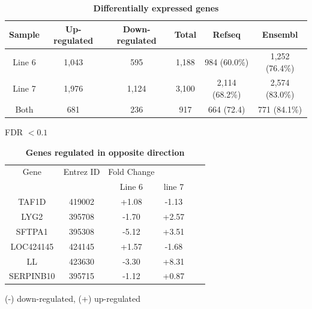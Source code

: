 \documentclass[10pt]{article}
\begin{document}
\begin{table}[!ht]
\caption{
\bf{Differentially expressed genes}}
\begin{tabular}{cccccc}
\hline
Sample & Up-regulated & Down-regulated & Total & Refseq & Ensembl\\
\hline
Line 6 & 1,043 & 595 & 1,188 & 984 (60.0\%) & 1,252 (76.4\%) \\
Line 7 & 1,976 & 1,124 & 3,100 & 2,114 (68.2\%) & 2,574 (83.0\%) \\
Both & 681 & 236 & 917 & 664 (72.4) & 771 (84.1\%) \\
\hline
\end{tabular}
\begin{flushleft}
    FDR $< 0.1$
\end{flushleft}
\label{tab:dge}
\end{table}

\begin{table}[!ht]
\caption{
\bf{Genes regulated in opposite direction}}
\begin{tabular}{cccccc}
\hline
Gene & Entrez ID & Fold Change & \\
 & & Line 6 & line 7 \\
\hline
TAF1D & 419002 & +1.08 & -1.13 \\
LYG2 & 395708 & -1.70 & +2.57 \\
SFTPA1 & 395308 & -5.12 & +3.51 \\
LOC424145 & 424145 & +1.57 & -1.68 \\
LL & 423630 & -3.30 & +8.31 \\
SERPINB10 & 395715 & -1.12 & +0.87 \\
\hline
\end{tabular}
\begin{flushleft}
    (-) down-regulated, (+) up-regulated
\end{flushleft}
\label{tab:opposite}
\end{table}
\end{document}
